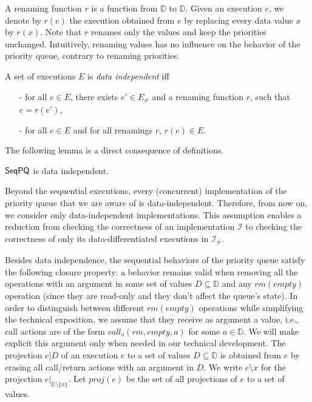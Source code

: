 A renaming function $r$ is a function from $\mathbb{D}$ to $\mathbb{D}$. Given an execution $e$, we denote by $r(e)$ the execution obtained from $e$ by replacing every data value $x$ by $r(x)$. Note that $r$ renames only the values and keep the priorities unchanged. Intuitively, renaming values has no influence on the behavior of the priority queue, contrary to renaming priorities.

\begin{definition}\label{def:priority-value data-independence}
A set of executions $E$ is \emph{data independent} iff
\begin{itemize}
\setlength{\itemsep}{0.5pt}
\item[-] for all $e \in E$, there exists $e' \in E_{\neq}$ and a renaming function $r$, such that $e=r(e')$,

\item[-] for all $e \in E$ and for all renamings $r$, $r(e) \in E$.
\end{itemize}
\end{definition}

The following lemma is a direct consequence of definitions.

\begin{lemma}
$\mathsf{SeqPQ}$ is data independent.
\end{lemma}

Beyond the sequential executions, every (concurrent) implementation of the priority queue that we are aware of is data-independent. Therefore, from now on, we consider only data-independent implementations. This assumption enables a reduction from checking the correctness of an implementation $\mathcal{I}$ to checking the correctness of only its data-differentiated executions in $\mathcal{I}_{\neq}$.

Besides data independence, the sequential behaviors of the priority queue satisfy the following closure property: a behavior remains valid when removing all the operations with an argument in some set of values $D \subseteq \mathbb{D}$ and any $\textit{rm}(\textit{empty})$ operation (since they are read-only and they don't affect the queue's state).
In order to distinguish between different $\textit{rm}(\textit{empty})$ operations while simplifying the technical exposition, we assume that they receive as argument a value, i.e., call actions are of the form $\textit{call}_o(\textit{rm},\textit{empty},a)$ for some $a\in \mathbb{D}$. We will make explicit this argument only when needed in our technical development. The projection $e \vert D$ of an execution $e$ to a set of values $D \subseteq \mathbb{D}$ is obtained from $e$ by erasing all call/return actions with an argument in $D$. We write $e \setminus x$ for the projection $e \vert_{ \mathbb{D} \setminus \{ x \} }$. Let $\textit{proj}(e)$ be the set of all projections of $e$ to a set of values.

